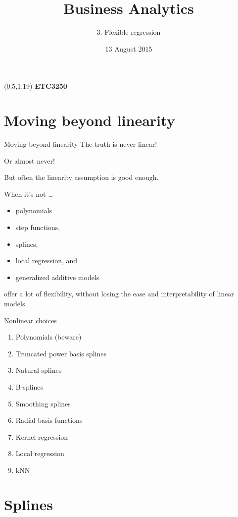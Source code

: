\documentclass[14pt]{beamer}
\title[3. Flexible regression]{Business Analytics}
\author{3. Flexible regression}
\date{13 August 2015}
\begin{document}
\begin{frame}[plain]{}
\maketitle
\begin{textblock}{11}(0.5,1.19){\color{white}\large
\textbf{ETC3250}}
\end{textblock}
\end{frame}

\section{Moving beyond linearity}

\begin{frame}{Moving beyond linearity}
The truth is never linear!\pause

Or almost never!\pause

But often the linearity assumption is good enough.\pause

When it's not \dots
\begin{itemize}
\item polynomials
\item step functions,
\item splines,
\item local regression, and
\item generalized additive models
\end{itemize}
offer a lot of flexibility, without losing the ease and
interpretability of linear models.

\end{frame}
\begin{frame}{Nonlinear choices}
\begin{enumerate}
\item Polynomials (beware)
\item Truncated power basis splines
\item Natural splines
\item B-splines
\item Smoothing splines
\item Radial basis functions
\item Kernel regression
\item Local regression
\item kNN
\end{enumerate}
\end{frame}

\section{Splines}
\end{document}
